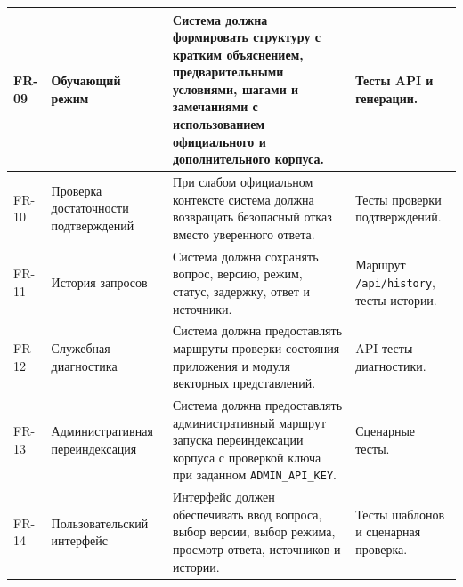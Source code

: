 \begin{longtable}{|P{0.08\textwidth}|P{0.22\textwidth}|P{0.42\textwidth}|P{0.18\textwidth}|}
FR-09 & Обучающий режим & Система должна формировать структуру с кратким объяснением, предварительными условиями, шагами и замечаниями с использованием официального и дополнительного корпуса. & Тесты API и генерации. \\ \hline
FR-10 & Проверка достаточности подтверждений & При слабом официальном контексте система должна возвращать безопасный отказ вместо уверенного ответа. & Тесты проверки подтверждений. \\ \hline
FR-11 & История запросов & Система должна сохранять вопрос, версию, режим, статус, задержку, ответ и источники. & Маршрут \texttt{/api/history}, тесты истории. \\ \hline
FR-12 & Служебная диагностика & Система должна предоставлять маршруты проверки состояния приложения и модуля векторных представлений. & API-тесты диагностики. \\ \hline
FR-13 & Административная переиндексация & Система должна предоставлять административный маршрут запуска переиндексации корпуса с проверкой ключа при заданном \texttt{ADMIN\_API\_KEY}. & Сценарные тесты. \\ \hline
FR-14 & Пользовательский интерфейс & Интерфейс должен обеспечивать ввод вопроса, выбор версии, выбор режима, просмотр ответа, источников и истории. & Тесты шаблонов и сценарная проверка. \\ \hline
\end{longtable}
\par\endgroup

